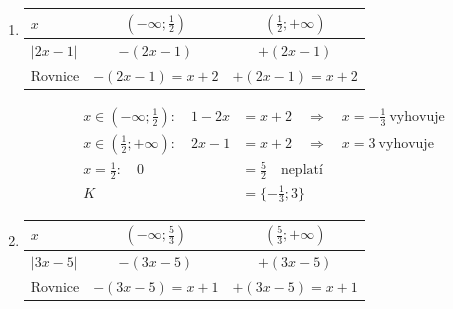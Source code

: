 \documentclass[11pt,a4paper]{article}
\begin{document}
\begin{zadaniReseniBox}[title={Domácí úkol}]
\begin{enumerate}[label=\alph*),itemsep=1pt]
\begin{center}
\begin{tabular}{@{}lcc@{}}
\toprule
$x$ & $(-\infty;-2)$ & $(-2;+\infty)$ \\
\midrule
$|3 x + 6|$ & $-(3 x + 6)$ & $+(3 x + 6)$ \\
\midrule
Rovnice & $-(3 x + 6)=0$ & $+(3 x + 6)=0$ \\
\bottomrule
\end{tabular}
\endgroup
\end{center}
\[\begin{aligned}x\in (-\infty;-2):\quad - 3 x - 6 &= 0\quad\Longrightarrow\quad x=-2\notin (-\infty;-2)\\[2pt]
x\in (-2;+\infty):\quad 3 x + 6 &= 0\quad\Longrightarrow\quad x=-2\notin (-2;+\infty)\\[2pt]
x=-2:\quad 0 &= 0\quad\text{platí}\\[2pt]
K&=\{-2\}\end{aligned}\]
\item
\begin{center}
\begingroup\footnotesize
\renewcommand{\arraystretch}{1.32}
\begin{tabular}{@{}lcc@{}}
\toprule
$x$ & $(-\infty;\frac{1}{2})$ & $(\frac{1}{2};+\infty)$ \\
\midrule
$|2 x - 1|$ & $-(2 x - 1)$ & $+(2 x - 1)$ \\
\midrule
Rovnice & $-(2 x - 1)=x + 2$ & $+(2 x - 1)=x + 2$ \\
\bottomrule
\end{tabular}
\endgroup
\end{center}
\[\begin{aligned}x\in (-\infty;\frac{1}{2}):\quad 1 - 2 x &= x + 2\quad\Longrightarrow\quad x=- \frac{1}{3}\ \text{vyhovuje}\\[2pt]
x\in (\frac{1}{2};+\infty):\quad 2 x - 1 &= x + 2\quad\Longrightarrow\quad x=3\ \text{vyhovuje}\\[2pt]
x=\frac{1}{2}:\quad 0 &= \frac{5}{2}\quad\text{neplatí}\\[2pt]
K&=\{- \frac{1}{3};3\}\end{aligned}\]
\item
\begin{center}\begingroup\footnotesize
\renewcommand{\arraystretch}{1.25}
\begin{tabular}{@{}lcc@{}}\toprule
$x$ & $(-\infty;\frac53)$ & $(\frac53;+\infty)$ \\
\midrule
$|3x-5|$ & $-(3x-5)$ & $+(3x-5)$ \\
\midrule
Rovnice & $-(3x-5)=x+1$ & $+(3x-5)=x+1$ \\

\end{tabular}
\end{center}
\end{enumerate}
\end{zadaniReseniBox}
\end{document}
